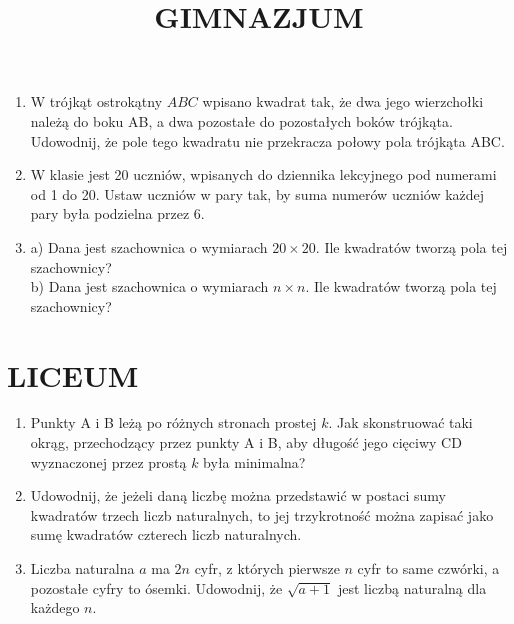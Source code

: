 \documentclass[10pt]{article}
\title{GIMNAZJUM }
\author{}
\date{}
\begin{document}
\maketitle
\begin{enumerate}
  \item W trójkąt ostrokątny \(A B C\) wpisano kwadrat tak, że dwa jego wierzchołki należą do boku AB, a dwa pozostałe do pozostałych boków trójkąta. Udowodnij, że pole tego kwadratu nie przekracza połowy pola trójkąta ABC.
  \item W klasie jest 20 uczniów, wpisanych do dziennika lekcyjnego pod numerami od 1 do 20. Ustaw uczniów w pary tak, by suma numerów uczniów każdej pary była podzielna przez 6.
  \item a) Dana jest szachownica o wymiarach \(20 \times 20\). Ile kwadratów tworzą pola tej szachownicy?\\
b) Dana jest szachownica o wymiarach \(n \times n\). Ile kwadratów tworzą pola tej szachownicy?
\end{enumerate}

\section*{LICEUM}
\begin{enumerate}
  \item Punkty A i B leżą po różnych stronach prostej \(k\). Jak skonstruować taki okrąg, przechodzący przez punkty A i B, aby długość jego cięciwy CD wyznaczonej przez prostą \(k\) była minimalna?
  \item Udowodnij, że jeżeli daną liczbę można przedstawić w postaci sumy kwadratów trzech liczb naturalnych, to jej trzykrotność można zapisać jako sumę kwadratów czterech liczb naturalnych.
  \item Liczba naturalna \(a\) ma \(2 n\) cyfr, z których pierwsze \(n\) cyfr to same czwórki, a pozostałe cyfry to ósemki. Udowodnij, że \(\sqrt{a+1}\) jest liczbą naturalną dla każdego \(n\).
\end{enumerate}
\end{document}
